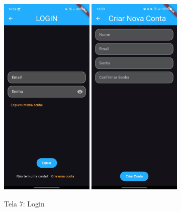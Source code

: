     \begin{figure}[h]
        \centering
        \includegraphics[width=0.4\textwidth]{imagens/login.jpg}
        \hspace{10mm}
        \includegraphics[width=0.4\textwidth]{imagens/registrar.jpg} %
        \caption{\scriptsize Tela 7: Login}
        \label{fig:tela7}
    \end{figure}

    \FloatBarrier
    
